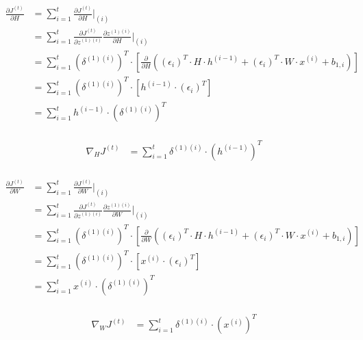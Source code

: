 \documentclass{article}
\begin{document}
	\begin{equation}
	\begin{aligned}
		\frac{\partial J^{(t)}}{\partial H} &= \sum_{i=1}^{t} \frac{\partial J^{(t)}}{\partial H}\bigg|_{(i)}  \\
		&= \sum_{i=1}^{t}
		\frac{\partial J^{(t)}}{\partial z^{(1)(i)}} 
		\frac{\partial z^{(1)(i)}}{\partial H}\bigg|_{(i)} \\
		&= \sum_{i=1}^{t}
		(\delta^{(1)(i)})^T \cdot \left[\frac{\partial }{\partial H} ((\epsilon_i)^T \cdot H \cdot h^{(i-1)} + (\epsilon_i)^T \cdot W \cdot x^{(i)} + b_{1,i})\right] \\
		&= \sum_{i=1}^{t}
		(\delta^{(1)(i)})^T \cdot \left[h^{(i-1)} \cdot (\epsilon_i)^T\right]\\	
		&= \sum_{i=1}^{t} h^{(i-1)} \cdot (\delta^{(1)(i)})^T\\
	\end{aligned}
	\end{equation}
	
	\begin{equation}
	\begin{aligned}
		\nabla_H J^{(t)} &= \sum_{i=1}^{t} \delta^{(1)(i)} \cdot  (h^{(i-1)})^T\\
	\end{aligned}
	\end{equation}
	
	\begin{equation}
	\begin{aligned}
		\frac{\partial J^{(t)}}{\partial W} &= \sum_{i=1}^{t} \frac{\partial J^{(t)}}{\partial W}\bigg|_{(i)}  \\
		&= \sum_{i=1}^{t}
		\frac{\partial J^{(t)}}{\partial z^{(1)(i)}} 
		\frac{\partial z^{(1)(i)}}{\partial W}\bigg|_{(i)} \\
		&= \sum_{i=1}^{t}
		(\delta^{(1)(i)})^T \cdot \left[\frac{\partial }{\partial W}((\epsilon_i)^T \cdot H \cdot h^{(i-1)} + (\epsilon_i)^T \cdot W \cdot x^{(i)} + b_{1,i})\right] \\
		&= \sum_{i=1}^{t}
		(\delta^{(1)(i)})^T \cdot \left[x^{(i)} \cdot (\epsilon_i)^T\right]\\	
		&= \sum_{i=1}^{t} x^{(i)} \cdot (\delta^{(1)(i)})^T\\
	\end{aligned}
	\end{equation}
	
	\begin{equation}
	\begin{aligned}
		\nabla_W J^{(t)} &= \sum_{i=1}^{t} \delta^{(1)(i)} \cdot  (x^{(i)})^T\\
	\end{aligned}
	\end{equation}	
		
\end{document}
